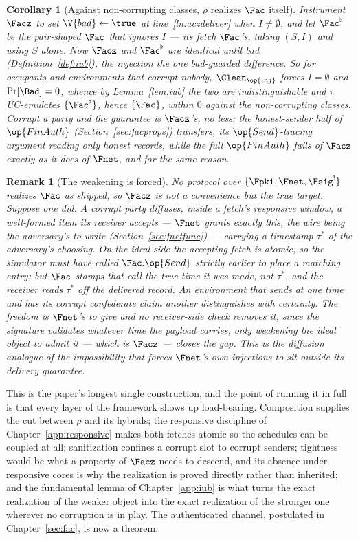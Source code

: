 \documentclass[10pt,oneside,openany]{book}
\theoremstyle{accentdef}
\newtheorem{remark}[definition]{Remark}
\theoremstyle{accentplain}
\newtheorem{corollary}[definition]{Corollary}
\begin{document}
\begin{corollary}[Against non-corrupting classes, $\rho$ realizes $\Fac$ itself]\label{cor:realac}
Instrument $\Facz$ to set $\V{bad} \gets \true$ at line~\ref{ln:aczdeliver} when $I \neq
\emptyset$, and let $\Fac^{\flat}$ be the pair-shaped $\Fac$ that ignores $I$ --- its fetch
$\Fac$'s, taking $(S,I)$ and using $S$ alone. Now $\Facz$ and $\Fac^{\flat}$ are identical until bad
(Definition~\ref{def:iub}), the injection the one bad-guarded difference. So for occupants and
environments that corrupt nobody, $\Clean_{\op{inj}}$ forces $I = \emptyset$ and $\Pr[\Bad] = 0$,
whence by Lemma~\ref{lem:iub} the two are indistinguishable and $\pi$ UC-emulates
$\{\Fac^{\flat}\}$, hence $\{\Fac\}$, within $0$ against the non-corrupting classes. Corrupt a
party and the guarantee is $\Facz$'s, no less: the honest-sender half of $\op{FinAuth}$
(Section~\ref{sec:facprops}) transfers, its $\op{Send}$-tracing argument reading only honest
records, while the full $\op{FinAuth}$ fails of $\Facz$ exactly as it does of $\Fnet$, and for the
same reason.
\end{corollary}

\begin{remark}[The weakening is forced]\label{rem:acimposs}
No protocol over $\{\Fpki,\Fnet,\Fsig^{!}\}$ realizes $\Fac$ as shipped, so $\Facz$ is not a
convenience but the true target. Suppose one did. A corrupt party diffuses, inside a fetch's
responsive window, a well-formed item its receiver accepts --- $\Fnet$ grants exactly this, the
wire being the adversary's to write (Section~\ref{sec:fnetfunc}) --- carrying a timestamp
$\tau^{*}$ of the adversary's choosing. On the ideal side the accepting fetch is atomic, so the
simulator must have called $\Fac.\op{Send}$ strictly earlier to place a matching entry; but $\Fac$
stamps that call the true time it was made, not $\tau^{*}$, and the receiver reads $\tau^{*}$ off
the delivered record. An environment that sends at one time and has its corrupt confederate claim
another distinguishes with certainty. The freedom is $\Fnet$'s to give and no receiver-side check
removes it, since the signature validates whatever time the payload carries; only weakening the
ideal object to admit it --- which is $\Facz$ --- closes the gap. This is the diffusion analogue
of the impossibility that forces $\Fnet$'s own injections to sit outside its delivery guarantee.
\end{remark}

This is the paper's longest single construction, and the point of running it in full is that
every layer of the framework shows up load-bearing. Composition supplies the cut between $\rho$
and its hybrids; the responsive discipline of Chapter~\ref{app:responsive} makes both fetches
atomic so the schedules can be coupled at all; sanitization confines a corrupt slot to corrupt
senders; tightness would be what a property of $\Facz$ needs to descend, and its absence under
responsive cores is why the realization is proved directly rather than inherited; and the
fundamental lemma of Chapter~\ref{app:iub} is what turns the exact realization of the weaker
object into the exact realization of the stronger one wherever no corruption is in play. The
authenticated channel, postulated in Chapter~\ref{sec:fac}, is now a theorem.
\end{document}
